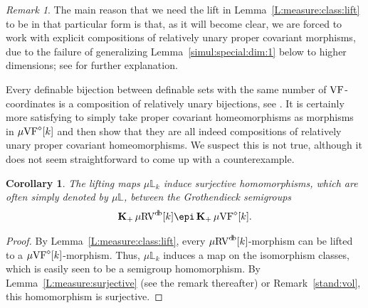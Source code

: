 \documentclass[12pt]{amsart}
\theoremstyle{plain}
\newtheorem{cor}[thm]{Corollary}
\theoremstyle{definition}
\theoremstyle{remark}
\newtheorem{rem}[thm]{Remark}
\numberwithin{equation}{section}
\theoremstyle{plain}
\newcommand{\VF}{\textup{VF}}
\newcommand{\RV}{\textup{RV}}
\newcommand{\0}{\emptyset}
\newcommand{\bb}[1]{\mathbb{#1}}
\newcommand{\mVF}{{\mu}{\VF}}
\newcommand{\mRV}{{\mu}{\RV}}
\DeclareMathOperator{\gsk}{\mathbf{K}_+}
\DeclareMathOperator{\db}{d \! b}
\begin{document}
\begin{rem}
The main reason that we need the lift in Lemma~\ref{L:measure:class:lift} to be in that particular form is that, as it will become clear, we are forced to work with explicit compositions of relatively unary proper covariant morphisms, due to the failure of generalizing Lemma~\ref{simul:special:dim:1} below to higher dimensions; see \cite[\S~1]{Yin:int:acvf} for further explanation.

Every definable bijection between definable sets with the same number of $\VF$-coordinates is a composition of relatively unary bijections, see \cite[Lemma~5.6]{Yin:int:acvf}.   It is certainly more satisfying to simply take proper covariant homeomorphisms as morphisms in $\mVF^{\diamond}[k]$ and then show that they are all indeed compositions of relatively unary proper covariant homeomorphisms. We suspect this is not true, although it does not seem straightforward to come up with a counterexample.
\end{rem}


\begin{cor}\label{L:sur:c}
The lifting maps ${\mu}\bb L_{k}$ induce surjective homomorphisms, which are often simply denoted by ${\mu}\bb L$, between the Grothendieck semigroups
\[
 \gsk \mRV^{\db}[k] \epi \gsk \mVF^{\diamond}[k].
\]
\end{cor}
\begin{proof}
By Lemma~\ref{L:measure:class:lift}, every $\mRV^{\db}[k]$-morphism can be lifted to a $\mVF^{\diamond}[k]$-morphism. Thus, ${\mu}\bb L_{k}$ induces a map on the isomorphism classes, which is easily seen to be a semigroup homomorphism. By Lemma~\ref{L:measure:surjective} (see the remark thereafter) or Remark~\ref{stand:vol}, this  homomorphism is surjective.
\end{proof}
\end{document}
